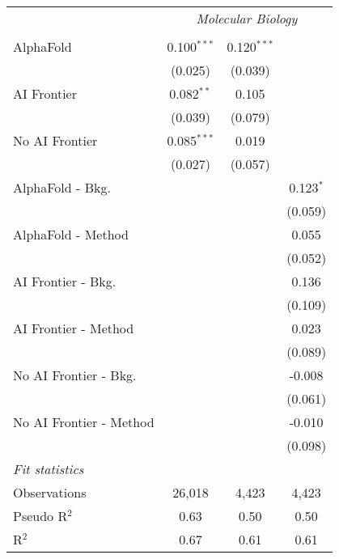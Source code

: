 \begin{tabular}{lccc}
 & \multicolumn{3}{c}{\textit{Molecular Biology}} \\ \\
   AlphaFold               & 0.100$^{***}$ & 0.120$^{***}$ &   \\   
                           & (0.025)       & (0.039)       &   \\   
   AI Frontier             & 0.082$^{**}$  & 0.105         &   \\   
                           & (0.039)       & (0.079)       &   \\   
   No AI Frontier          & 0.085$^{***}$ & 0.019         &   \\   
                           & (0.027)       & (0.057)       &   \\   
   AlphaFold - Bkg.        &               &               & 0.123$^{*}$\\   
                           &               &               & (0.059)\\   
   AlphaFold - Method      &               &               & 0.055\\   
                           &               &               & (0.052)\\   
   AI Frontier - Bkg.      &               &               & 0.136\\   
                           &               &               & (0.109)\\   
   AI Frontier - Method    &               &               & 0.023\\   
                           &               &               & (0.089)\\   
   No AI Frontier - Bkg.   &               &               & -0.008\\   
                           &               &               & (0.061)\\   
   No AI Frontier - Method &               &               & -0.010\\   
                           &               &               & (0.098)\\   
   \midrule
   \emph{Fit statistics}\\
   Observations            & 26,018        & 4,423         & 4,423\\  
   Pseudo R$^2$            & 0.63          & 0.50          & 0.50\\  
   R$^2$                   & 0.67          & 0.61          & 0.61\\  
   

\end{tabular}
